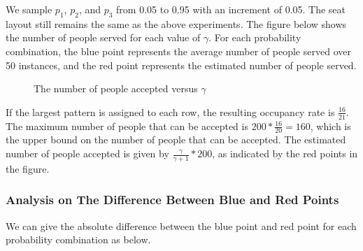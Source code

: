 We sample $p_1$, $p_2$, and $p_3$ from 0.05 to 0.95 with an increment of 0.05. The seat layout still remains the same as the above experiments. The figure below shows the number of people served for each value of $\gamma$. For each probability combination, the blue point represents the average number of people served over 50 instances, and the red point represents the estimated number of people served. 

\begin{figure}[h]
  \centering
  \caption{The number of people accepted versus $\gamma$}
\end{figure}

If the largest pattern is assigned to each row, the resulting occupancy rate is $\frac{16}{21}$. The maximum number of people that can be accepted is $200 * \frac{16}{20} = 160$, which is the upper bound on the number of people that can be accepted. The estimated number of people accepted is given by $\frac{\gamma}{\gamma+1} * 200$, as indicated by the red points in the figure.

\subsubsection{Analysis on The Difference Between Blue and Red Points}
We can give the absolute difference between the blue point and red point for each probability combination as below.

